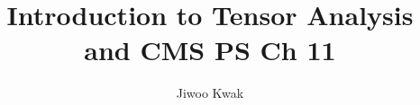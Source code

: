 \documentclass[A4]{homework}
\title{Introduction to Tensor Analysis and CMS PS Ch 11}
\author{Jiwoo Kwak}
\begin{document}
\maketitle

\newpage

%


\nocite{*} 
\printbibliography
\end{document}
